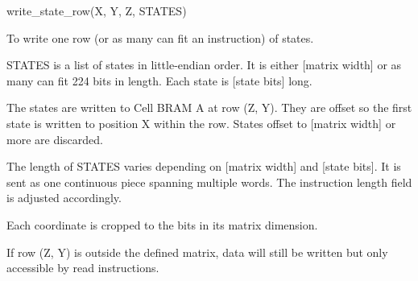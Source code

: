 

\format
write\_state\_row(X, Y, Z, STATES)

\purpose

To write one row (or as many can fit an instruction) of states.

\description

STATES is a list of states in little-endian order.
It is either [matrix width] or as many can fit 224 bits in length.
Each state is [state bits] long.

The states are written to Cell BRAM A at row (Z, Y).
They are offset so the first state is written to position X within the row.
States offset to [matrix width] or more are discarded.

The length of STATES varies depending on [matrix width] and [state bits].
It is sent as one continuous piece spanning multiple words.
The instruction length field is adjusted accordingly.

\notes

Each coordinate is cropped to the bits in its matrix dimension.

If row (Z, Y) is outside the defined matrix, data will still be written but only accessible by read instructions.
